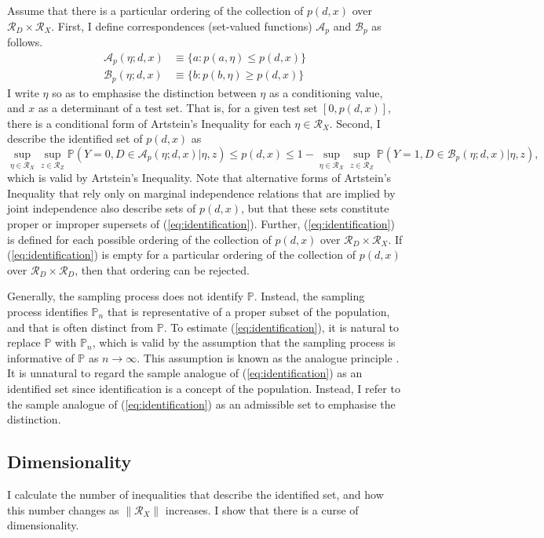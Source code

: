 \documentclass[10pt,a4paper,twoside]{article}
\numberwithin{equation}{section}
\newcommand{\Art}{Artstein's Inequality}
\begin{document}
Assume that there is a particular ordering of the collection of $p(d,x)$ over $\mathcal{R}_D\times\mathcal{R}_X$. First, I define correspondences (set-valued functions) $\mathcal{A}_p$ and $\mathcal{B}_p$ as follows.
\begin{align*}
\mathcal{A}_p(\eta;d,x)&\equiv\lbrace a : p(a,\eta)\leq p(d,x)\rbrace\\
\mathcal{B}_p(\eta;d,x)&\equiv\lbrace b : p(b,\eta)\geq p(d,x)\rbrace
\end{align*}
I write $\eta$ so as to emphasise the distinction between $\eta$ as a conditioning value, and $x$ as a determinant of a test set. That is, for a given test set $[0,p(d,x)]$, there is a conditional form of {\Art} for each $\eta\in\mathcal{R}_X$. Second, I describe the identified set of $p(d,x)$ as
\begin{equation}
\sup_{\eta\in\mathcal{R}_X}\sup_{z\in\mathcal{R}_Z}\mathbb{P}(Y=0,D\in\mathcal{A}_p(\eta;d,x)|\eta,z)\leq p(d,x)\leq 1-\sup_{\eta\in\mathcal{R}_X}\sup_{z\in\mathcal{R}_Z}\mathbb{P}(Y=1,D\in\mathcal{B}_p(\eta;d,x)|\eta,z),\label{eq:identification}
\end{equation}
which is valid by {\Art}. Note that alternative forms of {\Art} that rely only on marginal independence relations that are implied by joint independence also describe sets of $p(d,x)$, but that these sets constitute proper or improper supersets of (\ref{eq:identification}). Further, (\ref{eq:identification}) is defined for each possible ordering of the collection of $p(d,x)$ over $\mathcal{R}_D\times\mathcal{R}_X$. If (\ref{eq:identification}) is empty for a particular ordering of the collection of $p(d,x)$ over $\mathcal{R}_D\times\mathcal{R}_D$, then that ordering can be rejected. 

Generally, the sampling process does not identify $\mathbb{P}$. Instead, the sampling process identifies $\mathbb{P}_n$ that is representative of a proper subset of the population, and that is often distinct from $\mathbb{P}$. To estimate (\ref{eq:identification}), it is natural to replace $\mathbb{P}$ with $\mathbb{P}_n$, which is valid by the assumption that the sampling process is informative of $\mathbb{P}$ as $n\rightarrow\infty$. This assumption is known as the analogue principle \citep{book.analogue}. It is unnatural to regard the sample analogue of (\ref{eq:identification}) as an identified set since identification is a concept of the population. Instead, I refer to the sample analogue of (\ref{eq:identification}) as an admissible set to emphasise the distinction.   
\subsection{Dimensionality}
I calculate the number of inequalities that describe the identified set, and how this number changes as $\|\mathcal{R}_X\|$ increases. I show that there is a curse of dimensionality.
\end{document}
